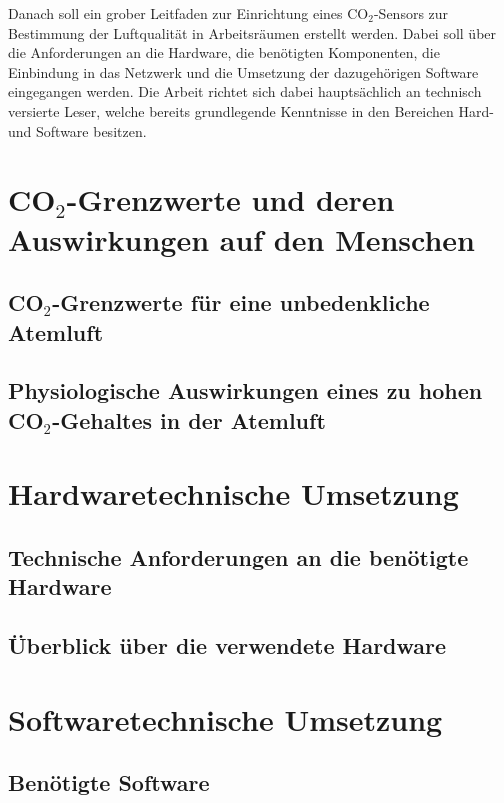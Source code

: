 \documentclass[a4paper,
    11pt,
    headings=small,
    ngerman,
    listof=totoc,
    numbers=noenddot]{scrreprt}[2021/11/13]
\begin{document}
Danach soll ein grober Leitfaden zur Einrichtung eines CO$_2$-Sensors zur Bestimmung der Luftqualität in Arbeitsräumen erstellt werden. Dabei soll über die Anforderungen an die Hardware, die benötigten Komponenten, die Einbindung in das Netzwerk und die Umsetzung der dazugehörigen Software eingegangen werden. Die Arbeit richtet sich dabei hauptsächlich an technisch versierte Leser, welche bereits grundlegende Kenntnisse in den Bereichen Hard- und Software besitzen.



\chapter{CO$_2$-Grenzwerte und deren Auswirkungen auf den Menschen}


\section{CO$_2$-Grenzwerte für eine unbedenkliche Atemluft}


\section{Physiologische Auswirkungen eines zu hohen CO$_2$-Gehaltes in der Atemluft}



\chapter{Hardwaretechnische Umsetzung}


\section{Technische Anforderungen an die benötigte Hardware}


\section{Überblick über die verwendete Hardware}



\chapter{Softwaretechnische Umsetzung}


\section{Benötigte Software}
\end{document}
